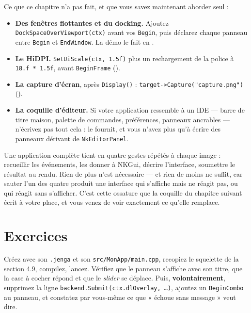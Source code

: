 Ce que ce chapitre n'a pas fait, et que vous savez maintenant aborder seul :

\begin{itemize}
  \item \textbf{Des fenêtres flottantes et du docking.} Ajoutez
        \texttt{DockSpaceOverViewport(ctx)} avant vos \texttt{Begin}, puis
        déclarez chaque panneau entre \texttt{Begin} et \texttt{EndWindow}. La
        démo le fait en .
  \item \textbf{Le HiDPI.} \texttt{SetUiScale(ctx, 1.5f)} plus un rechargement de
        la police à \texttt{18.f * 1.5f}, avant \texttt{BeginFrame}
        ().
  \item \textbf{La capture d'écran}, après \texttt{Display()} :
        \texttt{target->Capture("capture.png")}
        ().
  \item \textbf{La coquille d'éditeur.} Si votre application ressemble à un IDE —
        barre de titre maison, palette de commandes, préférences, panneaux
        ancrables — n'écrivez pas tout cela :  le
        fournit, et vous n'avez plus qu'à écrire des panneaux dérivant de
        \texttt{NkEditorPanel}.
\end{itemize}

\begin{nkbilan}
Une application complète tient en quatre gestes répétés à chaque image :
recueillir les événements, les donner à NKGui, décrire l'interface, soumettre le
résultat au rendu. Rien de plus n'est nécessaire --- et rien de moins ne suffit,
car sauter l'un des quatre produit une interface qui s'affiche mais ne réagit
pas, ou qui réagit sans s'afficher. C'est cette ossature que la coquille du
chapitre suivant écrit à votre place, et vous venez de voir exactement ce
qu'elle remplace.
\end{nkbilan}

\section{Exercices}

\begin{nkpratique}
Créez  avec son \texttt{.jenga} et son
\texttt{src/MonApp/main.cpp}, recopiez le squelette de la section 4.9,
compilez, lancez. Vérifiez que le panneau s'affiche avec son titre, que la case à
cocher répond et que le \emph{slider} se déplace. Puis, \textbf{volontairement},
supprimez la ligne \texttt{backend.Submit(ctx.dlOverlay, \dots)}, ajoutez un
\texttt{BeginCombo} au panneau, et constatez par vous-même ce que « échoue sans
message » veut dire.
\end{nkpratique}

